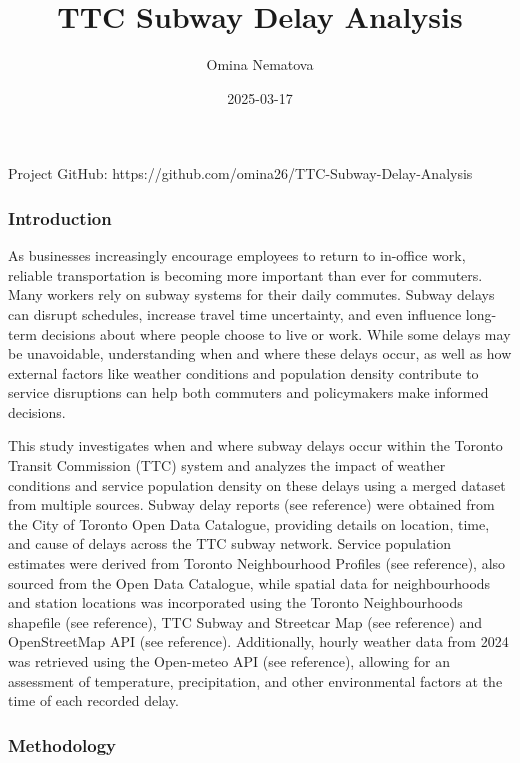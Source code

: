 \documentclass[
  letterpaper,
  DIV=11,
  numbers=noendperiod]{scrartcl}
\title{TTC Subway Delay Analysis}
\author{Omina Nematova}
\date{2025-03-17}
\makeatletter
\let\oldparagraph\paragraph
\renewcommand{\paragraph}{
    \@ifstar
      \xxxParagraphStar
      \xxxParagraphNoStar
  }
\newcommand{\xxxParagraphStar}[1]{\oldparagraph*{#1}\mbox{}}
\newcommand{\xxxParagraphNoStar}[1]{\oldparagraph{#1}\mbox{}}
\makeatother
\begin{document}
\maketitle


\paragraph{Project GitHub:
https://github.com/omina26/TTC-Subway-Delay-Analysis}\label{project-github-httpsgithub.comomina26ttc-subway-delay-analysis}

\subsubsection{Introduction}\label{introduction}

As businesses increasingly encourage employees to return to in-office
work, reliable transportation is becoming more important than ever for
commuters. Many workers rely on subway systems for their daily commutes.
Subway delays can disrupt schedules, increase travel time uncertainty,
and even influence long-term decisions about where people choose to live
or work. While some delays may be unavoidable, understanding when and
where these delays occur, as well as how external factors like weather
conditions and population density contribute to service disruptions can
help both commuters and policymakers make informed decisions.

This study investigates when and where subway delays occur within the
Toronto Transit Commission (TTC) system and analyzes the impact of
weather conditions and service population density on these delays using
a merged dataset from multiple sources. Subway delay reports (see
reference) were obtained from the City of Toronto Open Data Catalogue,
providing details on location, time, and cause of delays across the TTC
subway network. Service population estimates were derived from Toronto
Neighbourhood Profiles (see reference), also sourced from the Open Data
Catalogue, while spatial data for neighbourhoods and station locations
was incorporated using the Toronto Neighbourhoods shapefile (see
reference), TTC Subway and Streetcar Map (see reference) and
OpenStreetMap API (see reference). Additionally, hourly weather data
from 2024 was retrieved using the Open-meteo API (see reference),
allowing for an assessment of temperature, precipitation, and other
environmental factors at the time of each recorded delay.

\subsubsection{Methodology}\label{methodology}
\end{document}
